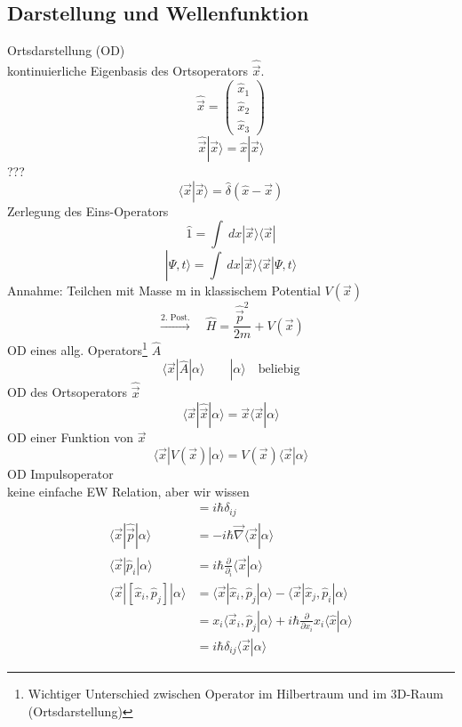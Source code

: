 \documentclass[10pt,article,colorback,accentcolor=tud9d]{scrartcl}
\begin{document}
\subsection{Darstellung und Wellenfunktion}
Ortsdarstellung (OD)\\
kontinuierliche Eigenbasis des Ortsoperators $\hat{\vec{x}}$.
$$
\hat{\vec{x}}=\left(\begin{array}{c} \hat{x}_1 \\ \hat{x}_2 \\ \hat{x}_3 \end{array}\right)
$$
$$
\hat{\vec{x}}\left.\right|\vec{x}\rangle=\hat{x}\left.\right|\vec{x}\rangle
$$
\textcolor[rgb]{1,0,0}{???}
\begin{equation}
\langle\vec{x}\left.\right|\vec{x}\rangle=\hat{\delta}(\hat{x}-\vec{x})
\end{equation}
Zerlegung des Eins-Operators
$$
\hat{1}=\int\ dx \left|\vec{x}\rangle\langle\vec{x}\right|
$$
\begin{equation}
\left.\right|\Psi,t\rangle=\int\ dx\left|\vec{x}\rangle\langle\vec{x}\right|\Psi,t\rangle
\label{eq:WellenfunktionOrtsdarstellung}
\end{equation}
Annahme: Teilchen mit Masse m in klassischem Potential $V(\vec{x})$
\begin{equation}
\xrightarrow{\text{2. Post.}} \quad \hat{H}=\frac{\hat{\vec{p}}^2}{2m}+V(\vec{x})
\label{eq:Hamiltonoperator}
\end{equation}
OD eines allg. Operators\footnote{Wichtiger Unterschied zwischen Operator im Hilbertraum und im 3D-Raum (Ortsdarstellung)} $\hat{A}$
$$
\langle\vec{x}\left|\right.\hat{A}\left.\right|\alpha\rangle \quad \quad \left.\right|\alpha\rangle \quad \text{beliebig}
$$
OD des Ortsoperators $\hat{\vec{x}}$
$$
\langle\vec{x}\left.\right|\hat{\vec{x}}\left.\right|\alpha\rangle=\vec{x}\langle\vec{x}\left.\right|\alpha\rangle
$$
OD einer Funktion von $\vec{x}$
$$
\langle\vec{x}\left.\right|V(\vec{x})\left.\right|\alpha\rangle=V(\vec{x})\langle\vec{x}\left.\right|\alpha\rangle
$$
OD Impulsoperator\\
keine einfache EW Relation, aber wir wissen
\begin{align}
[\hat{x}_i,\hat{p}_j]&=i\hbar\delta_{ij} \nonumber\\ \nonumber
\langle\vec{x}\left.\right|\hat{\vec{p}}\left.\right|\alpha\rangle&=-i\hbar\vec{\nabla}\langle\vec{x}\left.\right|\alpha\rangle\\ \nonumber
\langle\vec{x}\left.\right|\hat{p}_i\left.\right|\alpha\rangle&=i\hbar\frac{\partial}{\partial_i}\langle\vec{x}\left.\right|\alpha\rangle\\ \nonumber
\langle\vec{x}\left.\right|[\hat{x}_i,\hat{p}_j]\left.\right|\alpha\rangle&=\langle\vec{x}\left.\right|\hat{x}_i,\hat{p}_j\left.\right|\alpha\rangle-\langle\vec{x}\left.\right|\hat{x}_j,\hat{p}_i\left.\right|\alpha\rangle\\ 
&=x_i\langle\vec{x}_i,\hat{p}_j\left.\right|\alpha\rangle+i\hbar\frac{\partial}{\partial x_i}x_i\langle\hat{x}\left.\right|\alpha\rangle\nonumber\\
&=i\hbar\delta_{ij}\langle\vec{x}\left.\right|\alpha\rangle
\end{align}
\end{document}

